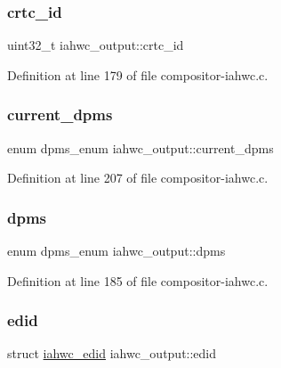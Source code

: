 \subsubsection{\texorpdfstring{crtc\+\_\+id}{crtc\_id}}
{\footnotesize\ttfamily uint32\+\_\+t iahwc\+\_\+output\+::crtc\+\_\+id}



Definition at line 179 of file compositor-\/iahwc.\+c.

\mbox{\label{structiahwc__output_a20868af3c280be48cfcbf0b96b0ab67c}} 
\subsubsection{\texorpdfstring{current\+\_\+dpms}{current\_dpms}}
{\footnotesize\ttfamily enum dpms\+\_\+enum iahwc\+\_\+output\+::current\+\_\+dpms}



Definition at line 207 of file compositor-\/iahwc.\+c.

\mbox{\label{structiahwc__output_ae2065bbaeeccc8c9b3515fd3423c808d}} 
\subsubsection{\texorpdfstring{dpms}{dpms}}
{\footnotesize\ttfamily enum dpms\+\_\+enum iahwc\+\_\+output\+::dpms}



Definition at line 185 of file compositor-\/iahwc.\+c.

\mbox{\label{structiahwc__output_a60fac1882a96e0bb4e1b6a6d14ac9f17}} 
\subsubsection{\texorpdfstring{edid}{edid}}
{\footnotesize\ttfamily struct \mbox{\hyperlink{structiahwc__edid}{iahwc\+\_\+edid}} iahwc\+\_\+output\+::edid}




